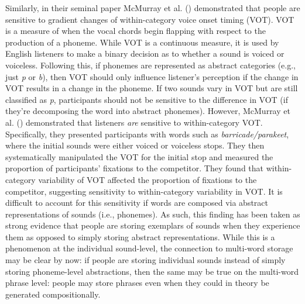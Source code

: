 \documentclass[
  12pt,
]{scrartcl}
\begin{document}
Similarly, in their seminal paper McMurray et al.
()
demonstrated that people are sensitive to gradient changes of
within-category voice onset timing (VOT). VOT is a measure of when the
vocal chords begin flapping with respect to the production of a phoneme.
While VOT is a continuous measure, it is used by English listeners to
make a binary decision as to whether a sound is voiced or voiceless.
Following this, if phonemes are represented as abstract categories
(e.g., just \emph{p} or \emph{b}), then VOT should only influence
listener's perception if the change in VOT results in a change in the
phoneme. If two sounds vary in VOT but are still classified as \emph{p},
participants should not be sensitive to the difference in VOT (if
they're decomposing the word into abstract phonemes). However, McMurray
et al.
()
demonstrated that listeners \emph{are} sensitive to within-category VOT.
Specifically, they presented participants with words such as
\emph{barricade/parakeet}, where the initial sounds were either voiced
or voiceless stops. They then systematically manipulated the VOT for the
initial stop and measured the proportion of participants' fixations to
the competitor. They found that within-category variability of VOT
affected the proportion of fixations to the competitor, suggesting
sensitivity to within-category variability in VOT. It is difficult to
account for this sensitivity if words are composed via abstract
representations of sounds (i.e., phonemes). As such, this finding has
been taken as strong evidence that people are storing exemplars of
sounds when they experience them as opposed to simply storing abstract
representations. While this is a phenomenon at the individual
sound-level, the connection to multi-word storage may be clear by now:
if people are storing individual sounds instead of simply storing
phoneme-level abstractions, then the same may be true on the multi-word
phrase level: people may store phrases even when they could in theory be
generated compositionally.
\end{document}
